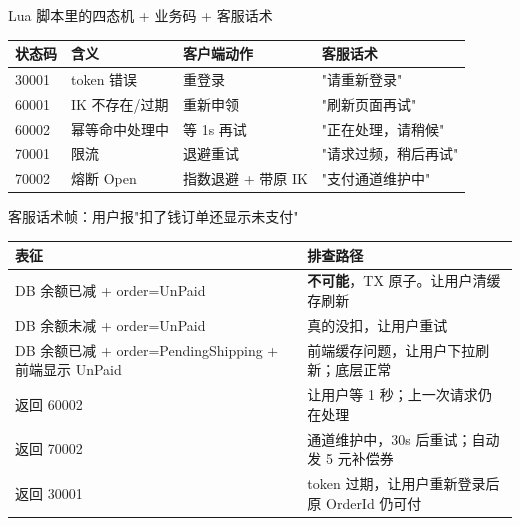 \documentclass[aspectratio=169,11pt]{beamer}
\begin{document}
\begin{frame}[shrink]{Lua 脚本里的四态机 + 业务码 + 客服话术}
\vspace{1mm}
\begin{tabular}{@{}llll@{}}
\toprule
状态码 & 含义               & 客户端动作          & 客服话术       \\
\midrule
30001  & token 错误         & 重登录              & "请重新登录" \\
60001  & IK 不存在/过期    & 重新申领            & "刷新页面再试" \\
60002  & 幂等命中处理中    & 等 1s 再试          & "正在处理，请稍候" \\
70001  & 限流              & 退避重试            & "请求过频，稍后再试" \\
70002  & 熔断 Open         & 指数退避 + 带原 IK  & "支付通道维护中" \\
\bottomrule
\end{tabular}
\end{frame}

\begin{frame}[shrink]{客服话术帧：用户报"扣了钱订单还显示未支付"}
\small
\begin{tabular}{@{}lp{8cm}@{}}
\toprule
表征 & 排查路径 \\
\midrule
DB 余额已减 + order=UnPaid & \textbf{不可能}，TX 原子。让用户清缓存刷新 \\
DB 余额未减 + order=UnPaid & 真的没扣，让用户重试 \\
DB 余额已减 + order=PendingShipping + 前端显示 UnPaid & 前端缓存问题，让用户下拉刷新；底层正常 \\
返回 60002 & 让用户等 1 秒；上一次请求仍在处理 \\
返回 70002 & 通道维护中，30s 后重试；自动发 5 元补偿券 \\
返回 30001 & token 过期，让用户重新登录后原 OrderId 仍可付 \\
\bottomrule
\end{tabular}
\vspace{1mm}
\end{frame}
\end{document}
